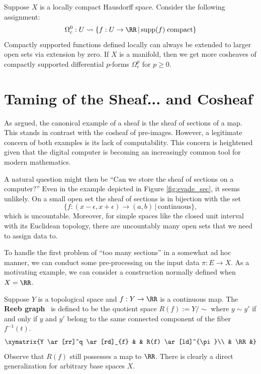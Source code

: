 \begin{ex}
	Suppose $X$ is a locally compact Hausdorff space. Consider the following assignment:
	\[
	\Omega^0_c: U \rightsquigarrow \{f:U\to \RR \,|\, \mathrm{supp}(f) \; \mathrm{compact}\}
	\]
	Compactly supported functions defined locally can always be extended to larger open sets via extension by zero. If $X$ is a manifold, then we get more cosheaves of compactly supported differential $p$-forms $\Omega^p_c$ for $p\geq 0$.
\end{ex}



\section{Taming of the Sheaf... and Cosheaf}
\label{subsec:reeb}

As argued, the canonical example of a sheaf is the sheaf of sections of a map. This stands in contrast with the cosheaf of pre-images. However, a legitimate concern of both examples is its lack of computability. This concern is heightened given that the digital computer is becoming an increasingly common tool for modern mathematics.

A natural question might then be ``Can we store the sheaf of sections on a computer?'' Even in the example depicted in Figure \ref{fig:evade_sec}, it seems unlikely. On a small open set the sheaf of sections is in bijection with the set 
\[
\{f:(x-\epsilon,x+\epsilon)\to (a,b) \, |\, \mathrm{continuous}\},
\] 
which is uncountable. Moreover, for simple spaces like the closed unit interval with its Euclidean topology, there are uncountably many open sets that we need to assign data to.

To handle the first problem of ``too many sections'' in a somewhat ad hoc manner, we can conduct some pre-processing on the input data $\pi:E\to X$. As a motivating example, we can consider a construction normally defined when $X=\RR$.

\begin{defn}\label{defn:reeb_graph}
	Suppose $Y$ is a topological space and $f:Y\to\RR$ is a continuous map. The \textbf{Reeb graph}~\cite{Reeb} is defined to be the quotient space $R(f):=Y/ \sim$ where $y\sim y'$ if and only if $y$ and $y'$ belong to the same connected component of the fiber $f^{-1}(t)$.
	\[
		\xymatrix{Y \ar[rr]^q \ar[rd]_{f} & & R(f) \ar[ld]^{\pi}\\
		& \RR &}
	\]
	Observe that $R(f)$ still possesses a map to $\RR$. There is clearly a direct generalization for arbitrary base spaces $X$.
\end{defn}

